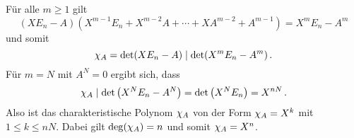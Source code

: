 \section{}





\addtocounter{subsection}{1}





\subsection{}

Für alle $m \geq 1$ gilt
\[
    (X E_n - A)(X^{m-1} E_n + X^{m-2} A + \dotsb + X A^{m-2} + A^{m-1})
  = X^m E_n - A^m
\]
und somit
\[
            \chi_{A}
  =         \det(X E_n - A)
  \mathrel{|}  \det(X^m E_n - A^m) \,.
\]
Für $m = N$ mit $A^N = 0$ ergibt sich, dass
\[
            \chi_{A}
  \mathrel{|}  \det\left( X^N E_n - A^N \right)
  =         \det\left( X^N E_n \right)
  =         X^{nN} \,.
\]
Also ist das charakteristische Polynom $\chi_{A}$ von der Form $\chi_{A} = X^k$ mit $1 \leq k \leq nN$.
Dabei gilt $\deg(\chi_{A}) = n$ und somit $\chi_{A} = X^n$.
